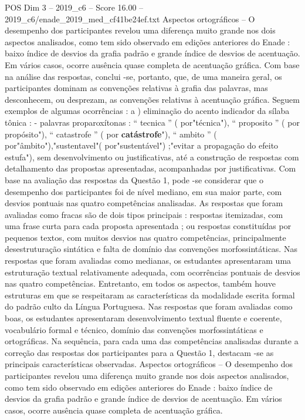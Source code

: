\begin{textsample}{POS Dim 3 – 2019\_c6 – Score 16.00 – 2019\_c6/enade\_2019\_med\_cf41be24ef.txt}
Aspectos ortográficos – O desempenho dos participantes revelou uma diferença muito grande nos dois aspectos analisados, como tem sido observado em edições anteriores do Enade : baixo índice de desvios da grafia padrão e grande índice de desvios de acentuação.
Em vários casos, ocorre ausência quase completa de acentuação gráfica.
Com base na análise das respostas, conclui -se, portanto, que, de uma maneira geral, os participantes dominam as convenções relativas à grafia das palavras, mas desconhecem, ou desprezam, as convenções relativas à acentuação gráfica.
Seguem exemplos de algumas ocorrências : a ) eliminação do acento indicador da sílaba tônica : - palavras proparoxítonas : “ tecnica ” ( por"técnica"), “ proposito ” ( por propósito"), “ catastrofe ” ( por \textbf{catástrofe}"), “ ambito ” ( por"âmbito"),"sustentavel"( por"sustentável") ;"evitar a propagação do efeito estufa"), sem desenvolvimento ou justificativas, até a construção de respostas com detalhamento das propostas apresentadas, acompanhadas por justificativas.
Com base na avaliação das respostas da Questão 1, pode -se considerar que o desempenho dos participantes foi de nível mediano, em sua maior parte, com desvios pontuais nas quatro competências analisadas.
As respostas que foram avaliadas como fracas são de dois tipos principais : respostas itemizadas, com uma frase curta para cada proposta apresentada ; ou respostas constituídas por pequenos textos, com muitos desvios nas quatro competências, principalmente desestruturação sintática e falta de domínio das convenções morfossintáticas.
Nas respostas que foram avaliadas como medianas, os estudantes apresentaram uma estruturação textual relativamente adequada, com ocorrências pontuais de desvios nas quatro competências.
Entretanto, em todos os aspectos, também houve estruturas em que se respeitaram as características da modalidade escrita formal do padrão culto da Língua Portuguesa.
Nas respostas que foram avaliadas como boas, os estudantes apresentaram desenvolvimento textual fluente e coerente, vocabulário formal e técnico, domínio das convenções morfossintáticas e ortográficas.
Na sequência, para cada uma das competências analisadas durante a correção das respostas dos participantes para a Questão 1, destacam -se as principais características observadas.
Aspectos ortográficos – O desempenho dos participantes revelou uma diferença muito grande nos dois aspectos analisados, como tem sido observado em edições anteriores do Enade : baixo índice de desvios da grafia padrão e grande índice de desvios de acentuação.
Em vários casos, ocorre ausência quase completa de acentuação gráfica.

\end{textsample}
